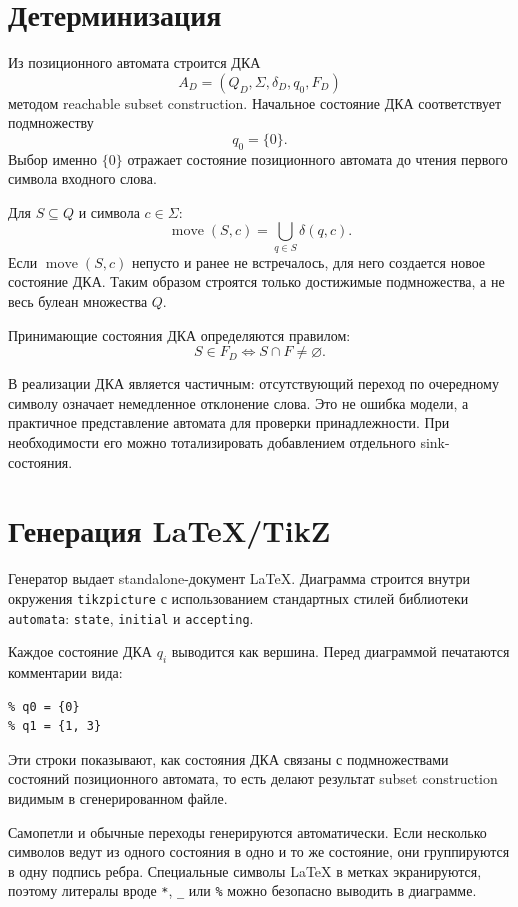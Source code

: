 \documentclass[12pt,a4paper]{article}
\newcommand{\move}{\operatorname{move}}
\begin{document}
\section{Детерминизация}

Из позиционного автомата строится ДКА
\[
A_D=(Q_D,\Sigma,\delta_D,q_0,F_D)
\]
методом reachable subset construction. Начальное состояние ДКА соответствует
подмножеству
\[
q_0=\{0\}.
\]
Выбор именно $\{0\}$ отражает состояние позиционного автомата до чтения первого
символа входного слова.

Для $S\subseteq Q$ и символа $c\in\Sigma$:
\[
\move(S,c)=\bigcup_{q\in S}\delta(q,c).
\]
Если $\move(S,c)$ непусто и ранее не встречалось, для него создается новое
состояние ДКА. Таким образом строятся только достижимые подмножества, а не весь
булеан множества $Q$.

Принимающие состояния ДКА определяются правилом:
\[
S\in F_D \iff S\cap F\ne\varnothing.
\]

В реализации ДКА является частичным: отсутствующий переход по очередному
символу означает немедленное отклонение слова. Это не ошибка модели, а
практичное представление автомата для проверки принадлежности. При необходимости
его можно тотализировать добавлением отдельного sink-состояния.

\section{Генерация LaTeX/TikZ}

Генератор выдает standalone-документ LaTeX. Диаграмма строится внутри
окружения \verb|tikzpicture| с использованием стандартных стилей библиотеки
\verb|automata|: \verb|state|, \verb|initial| и \verb|accepting|.

Каждое состояние ДКА $q_i$ выводится как вершина. Перед диаграммой печатаются
комментарии вида:
\begin{verbatim}
% q0 = {0}
% q1 = {1, 3}
\end{verbatim}
Эти строки показывают, как состояния ДКА связаны с подмножествами состояний
позиционного автомата, то есть делают результат subset construction видимым в
сгенерированном файле.

Самопетли и обычные переходы генерируются автоматически. Если несколько
символов ведут из одного состояния в одно и то же состояние, они группируются в
одну подпись ребра. Специальные символы LaTeX в метках экранируются, поэтому
литералы вроде \verb|*|, \verb|_| или \verb|%| можно безопасно выводить в
диаграмме.
\end{document}

